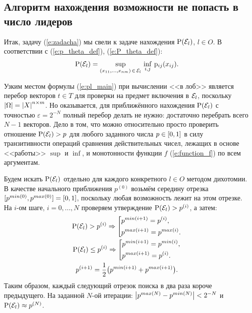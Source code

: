 \subsection{Алгоритм нахождения возможности не попасть в число лидеров}

 Итак, задачу (\ref{e:zadacha}) мы свели к задаче нахождения ${\mathrm{P}}(\mathcal{E}_l)$, $l \in O$. В соответствии с (\ref{e:p_theta_def}), (\ref{e:P_theta_def}):
\begin{equation}
  \label{e:pl_main}
  {\mathrm{P}}(\mathcal{E}_l) = \sup_{(x_{11}, ..., x_{nm})\,\in\,\mathcal{E}_l} \, \inf_{i, j}\,{\mathrm{p}}_{ij}(x_{ij}). 
\end{equation}

Узким местом формулы (\ref{e:pl_main}) при вычислении <<в лоб>> является перебор векторов $t \in T$ для проверки на предмет включения в $\mathcal{E}_l$, поскольку $\left| \Omega \right| = \left| X \right|^{n \times m}$. Но оказывается, для приближённого нахождения ${\mathrm{P}}(\mathcal{E}_l)$ с точностью $\varepsilon = 2^{-N}$ полный перебор делать не нужно: достаточно перебрать всего $N-1$ векторов. Дело в том, что можно относительно просто проверить отношение ${\mathrm{P}}(\mathcal{E}_l) > p$ для любого заданного числа $p \in [0,1]$ в силу транзитивности операций сравнения действительных чисел, лежащих в основе <<работы>>  $\sup$ и $\inf$, и монотонности функции $f$ (\ref{e:function_f}) по всем аргументам. 

Будем искать ${\mathrm{P}}(\mathcal{E}_l)$ отдельно для каждого конкретного $l \in O$ методом дихотомии. В качестве начального приближения $p^{(0)}$ возьмём середину отрезка $[p^{min(0)}, p^{max(0)}] = [0,1]$, поскольку любая возможность лежит на этом отрезке. На $i$-ом шаге, $i = 0, ..., N$ проверяем утверждение ${\mathrm{P}}(\mathcal{E}_l) > p^{(i)}$, а затем:
\begin{gather*}
 \P(\Eps_l) > p^{(i)} \Rightarrow 
    \left[ 
      \begin{gathered} 
        p^{min(i+1)} = p^{(i)}, \hfill 
        \\ 
        p^{max(i+1)} = p^{max(i)}. \hfill 
        \\ 
      \end{gathered} 
    \right. \\ 
 \P(\Eps_l) \leq p^{(i)} \Rightarrow 
    \left[ 
      \begin{gathered} 
        p^{min(i+1)} = p^{min(i)}, \hfill 
        \\ 
        p^{max(i+1)} = p^{(i)}. \hfill 
        \\ 
      \end{gathered} 
    \right. \\
 p^{(i+1)} = \frac{1}{2}\big(p^{min(i+1)} + p^{max(i+1)}\big).  
\end{gather*}
Таким образом, каждый следующий отрезок поиска в два раза короче предыдущего. На заданной $N$-ой итерации: $\left| p^{max(N)} - p^{min(N)} \right| < 2^{-N}$ и ${\mathrm{P}}(\mathcal{E}_l) \approx p^{(N)}$. %


